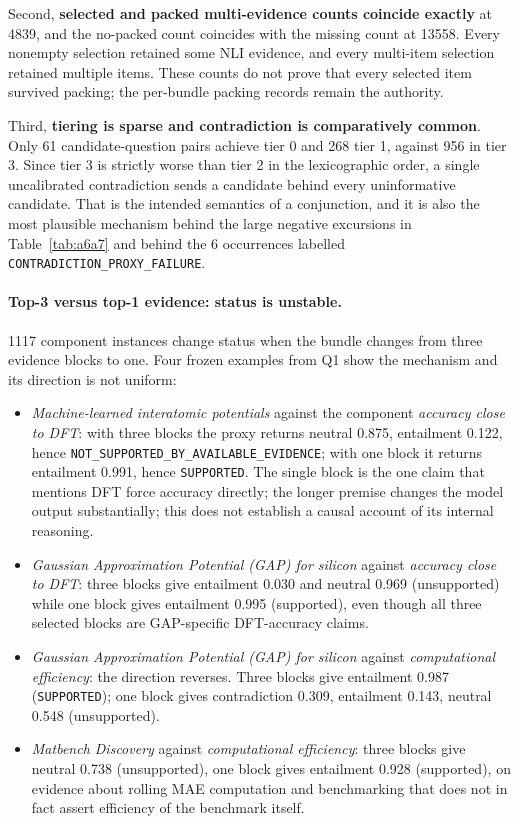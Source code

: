 \documentclass[11pt,a4paper]{article}
\begin{document}
Second, \textbf{selected and packed multi-evidence counts coincide exactly} at 4839, and the no-packed count coincides with the missing count at 13558. Every nonempty selection retained some NLI evidence, and every multi-item selection retained multiple items. These counts do not prove that every selected item survived packing; the per-bundle packing records remain the authority.

Third, \textbf{tiering is sparse and contradiction is comparatively common}. Only 61 candidate-question pairs achieve tier 0 and 268 tier 1, against 956 in tier 3. Since tier 3 is strictly worse than tier 2 in the lexicographic order, a single uncalibrated contradiction sends a candidate behind every uninformative candidate. That is the intended semantics of a conjunction, and it is also the most plausible mechanism behind the large negative excursions in Table~\ref{tab:a6a7} and behind the 6 occurrences labelled \texttt{CONTRADICTION\_PROXY\_FAILURE}.

\paragraph{Top-3 versus top-1 evidence: status is unstable.} 1117 component instances change status when the bundle changes from three evidence blocks to one. Four frozen examples from Q1 show the mechanism and its direction is not uniform:

\begin{itemize}
\item \emph{Machine-learned interatomic potentials} against the component \emph{accuracy close to DFT}: with three blocks the proxy returns neutral 0.875, entailment 0.122, hence \texttt{NOT\_SUPPORTED\_BY\_}\allowbreak\texttt{AVAILABLE\_EVIDENCE}; with one block it returns entailment 0.991, hence \texttt{SUPPORTED}. The single block is the one claim that mentions DFT force accuracy directly; the longer premise changes the model output substantially; this does not establish a causal account of its internal reasoning.
\item \emph{Gaussian Approximation Potential (GAP) for silicon} against \emph{accuracy close to DFT}: three blocks give entailment 0.030 and neutral 0.969 (unsupported) while one block gives entailment 0.995 (supported), even though all three selected blocks are GAP-specific DFT-accuracy claims.
\item \emph{Gaussian Approximation Potential (GAP) for silicon} against \emph{computational efficiency}: the direction reverses. Three blocks give entailment 0.987 (\texttt{SUPPORTED}); one block gives contradiction 0.309, entailment 0.143, neutral 0.548 (unsupported).
\item \emph{Matbench Discovery} against \emph{computational efficiency}: three blocks give neutral 0.738 (unsupported), one block gives entailment 0.928 (supported), on evidence about rolling MAE computation and benchmarking that does not in fact assert efficiency of the benchmark itself.
\end{itemize}
\end{document}
